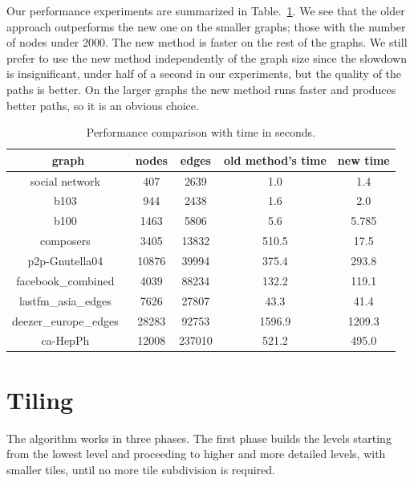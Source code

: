 \documentclass{gd-llncs}
\begin{document}
{Our performance experiments are summarized in Table.~\ref{tab:perf}. We see that the older approach outperforms the new one on the smaller graphs; those with the number of nodes under 2000. The new method is faster on the rest of the graphs. We still prefer to use the new method independently of the graph size since the slowdown is insignificant, under half of a second in our experiments, but the quality of the paths is better. On the larger graphs the new method runs faster and produces better paths, so it is an obvious choice.
\begin{table}
  \begin{center}
    \begin{tabular}{||c |c| c| c| c||}
      \hline
      graph                                   & nodes & edges  & old method's time & new time \\ [0.5ex]
      \hline\hline
      social network~\cite{beveridge2018game} & 407   & 2639   & 1.0               & 1.4      \\
      \hline
      b103~\cite{b103}                        & 944   & 2438   & 1.6               & 2.0      \\
      \hline
      b100~\cite{b100}                        & 1463  & 5806   & 5.6               & 5.785    \\
      \hline
      composers~\cite{composers}              & 3405  & 13832  & 510.5             & 17.5     \\
      \hline
      p2p-Gnutella04~\cite{gnutella}          & 10876 & 39994  & 375.4             & 293.8    \\
      \hline
      facebook\_combined~\cite{fb}            & 4039  & 88234  & 132.2             & 119.1    \\
      \hline
      lastfm\_asia\_edges~\cite{feather}      & 7626  & 27807  & 43.3              & 41.4     \\
      \hline
      deezer\_europe\_edges~\cite{feather}    & 28283 & 92753  & 1596.9            & 1209.3   \\
      \hline
      ca-HepPh~\cite{leskovec2007graph}       & 12008 & 237010 & 521.2             & 495.0    \\
      \hline
    \end{tabular}
    \caption{Performance comparison with time in seconds.}
    \label{tab:perf}
  \end{center}

\end{table}
\section{Tiling}
The algorithm works in three phases. The first phase builds the levels starting from the lowest level and proceeding to higher and more detailed levels, with smaller tiles, until no more tile subdivision is required. 

}
\end{document}
